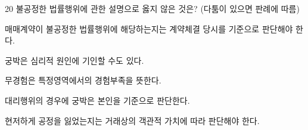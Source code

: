\begin{question}{20}
불공정한 법률행위에 관한 설명으로 옳지 않은 것은? (다툼이 있으면 판례에 따름)
\begin{choices}
  \item 매매계약이 불공정한 법률행위에 해당하는지는 계약체결 당시를 기준으로 판단해야 한다.
  \item 궁박은 심리적 원인에 기인할 수도 있다.
  \item 무경험은 특정영역에서의 경험부족을 뜻한다.
  \item 대리행위의 경우에 궁박은 본인을 기준으로 판단한다.
  \item 현저하게 공정을 잃었는지는 거래상의 객관적 가치에 따라 판단해야 한다.
\end{choices}
\end{question}
